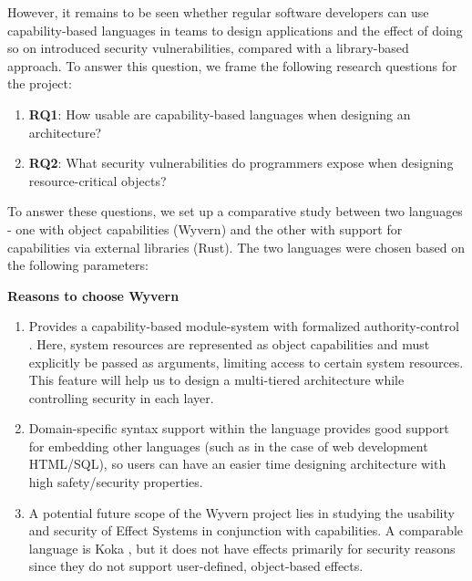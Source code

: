 However, it remains to be seen whether regular software developers can use capability-based languages in teams to design applications and the effect of doing so on introduced security vulnerabilities, compared with a library-based approach. To answer this question, we frame the following research questions for the project:

\begin{enumerate}
    \item \textbf{RQ1}: How usable are capability-based languages when designing an architecture?
    \item \textbf{RQ2}: What security vulnerabilities do programmers expose when designing resource-critical objects?  
\end{enumerate}

To answer these questions, we set up a comparative study between two languages - one with object capabilities (Wyvern) and the other with support for capabilities via external libraries (Rust). The two languages were chosen based on the following parameters:

\noindent
\textbf{Reasons to choose Wyvern}
\begin{enumerate}
    \item Provides a capability-based module-system with formalized authority-control \cite{DBLP:journals/darts/MelicherSPA17}. Here, system resources are represented as object capabilities and must explicitly be passed as arguments, limiting access to certain system resources. This feature will help us to design a multi-tiered architecture while controlling security in each layer.
    \item Domain-specific syntax support within the language provides good support for embedding other languages (such as in the case of web development HTML/SQL), so users can have an easier time designing architecture with high safety/security properties.
    \item A potential future scope of the Wyvern project lies in studying the usability and security of Effect Systems in conjunction with capabilities. A comparable language is Koka \cite{leijen2014koka}, but it does not have effects primarily for security reasons since they do not support user-defined, object-based effects.
\end{enumerate}


